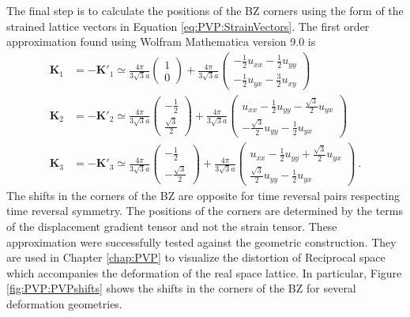The final step is to calculate the positions of the BZ corners using the form of the strained lattice vectors in  Equation \ref{eq:PVP:StrainVectors}.
The first order approximation found using Wolfram Mathematica version 9.0 is
\begin{align*}
	\bm{K}_1&=-\bm{K'}_1\simeq 
		\frac{4 \pi}{3 \sqrt{3} a} \left( \begin{array}{cc} 1 \\ 0 \end{array} \right)
		+
		\frac{4 \pi}{3 \sqrt{3} a} \left( \begin{array}{cc}
		-\frac{1}{2} u_{xx}-\frac{1}{2}u_{yy} \\
		-\frac{1}{2} u_{yx} - \frac{3}{2} u_{xy}
		\end{array} \right) \\
	\bm{K}_2&=-\bm{K'}_2\simeq 
		\frac{4 \pi}{3 \sqrt{3} a} \left( \begin{array}{cc} -\frac{1}{2} \\ \frac{\sqrt{3}}{2} \end{array} \right)
		+
		\frac{4 \pi}{3 \sqrt{3} a} \left( \begin{array}{cc}
		u_{xx}-\frac{1}{2}u_{yy}-\frac{\sqrt{3}}{2} u_{yx} \\
		-\frac{\sqrt{3}}{2} u_{yy}-\frac{1}{2}u_{yx}
		\end{array} \right) 	\\
	\bm{K}_3&=-\bm{K'}_3\simeq 
		\frac{4 \pi}{3 \sqrt{3} a} \left( \begin{array}{cc} -\frac{1}{2} \\ -\frac{\sqrt{3}}{2} \end{array} \right)
		+
		\frac{4 \pi}{3 \sqrt{3} a} \left( \begin{array}{cc}
		u_{xx}-\frac{1}{2}u_{yy}+\frac{\sqrt{3}}{2} u_{yx} \\
		\frac{\sqrt{3}}{2}u_{yy}-\frac{1}{2} u_{yx}
		\end{array} \right) \ .
\end{align*}
The shifts in the corners of the BZ are opposite for time reversal pairs respecting time reversal symmetry.
The positions of the corners are determined by the terms of the displacement gradient tensor and not the strain tensor.
These approximation were successfully tested against the geometric construction.
They are used in Chapter \ref{chap:PVP} to visualize the distortion of Reciprocal space which accompanies the deformation of the real space lattice.
In particular, Figure \ref{fig:PVP:PVPshifts} shows the shifts in the corners of the BZ for several deformation geometries.